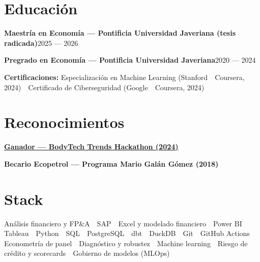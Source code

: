 \documentclass[a4paper,10pt]{article}
\newcommand{\row}[2]{\textbf{\color{ink}#1}\hfill{\small #2}\par}
\begin{document}
\section*{Educación}
\row{Maestría en Economía \textnormal{---} Pontificia Universidad Javeriana \textnormal{(tesis radicada)}}{2025 --- 2026}
\row{Pregrado en Economía \textnormal{---} Pontificia Universidad Javeriana}{2020 --- 2024}
{\small\textbf{\color{ink}Certificaciones:} Especialización en Machine Learning (Stanford \,\textperiodcentered\, Coursera, 2024) \,\textperiodcentered\, Certificado de Ciberseguridad (Google \,\textperiodcentered\, Coursera, 2024)}\par

\section*{Reconocimientos}
\row{\href{https://public.tableau.com/app/profile/davirson.novoa/viz/BodyTrendsADataAnalysisProject/TrendsAnalysis}{Ganador --- BodyTech Trends Hackathon \textnormal{(2024)}}}{}
\row{Becario Ecopetrol --- Programa Mario Galán Gómez \textnormal{(2018)}}{}

\section*{Stack}
Análisis financiero y FP\&A \,\textperiodcentered\, SAP \,\textperiodcentered\, Excel y modelado financiero \,\textperiodcentered\, Power BI \,\textperiodcentered\, Tableau \,\textperiodcentered\, Python \,\textperiodcentered\, SQL \,\textperiodcentered\, PostgreSQL \,\textperiodcentered\, dbt \,\textperiodcentered\, DuckDB \,\textperiodcentered\, Git \,\textperiodcentered\, GitHub Actions \,\textperiodcentered\, Econometría de panel \,\textperiodcentered\, Diagnóstico y robustez \,\textperiodcentered\, Machine learning \,\textperiodcentered\, Riesgo de crédito y scorecards \,\textperiodcentered\, Gobierno de modelos (MLOps)
\end{document}
